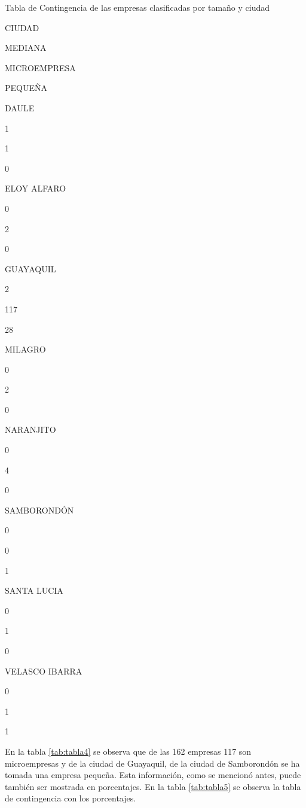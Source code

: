 \documentclass[]{book}
\newenvironment{Shaded}{\begin{snugshade}}{\end{snugshade}}
\newcommand{\KeywordTok}[1]{\textcolor[rgb]{0.13,0.29,0.53}{\textbf{#1}}}
\newcommand{\DataTypeTok}[1]{\textcolor[rgb]{0.13,0.29,0.53}{#1}}
\newcommand{\DecValTok}[1]{\textcolor[rgb]{0.00,0.00,0.81}{#1}}
\newcommand{\StringTok}[1]{\textcolor[rgb]{0.31,0.60,0.02}{#1}}
\newcommand{\OperatorTok}[1]{\textcolor[rgb]{0.81,0.36,0.00}{\textbf{#1}}}
\newcommand{\NormalTok}[1]{#1}
\begin{document}
\label{tab:tabla4}Tabla de Contingencia de las empresas clasificadas por
tamaño y ciudad

CIUDAD

MEDIANA

MICROEMPRESA

PEQUEÑA

DAULE

1

1

0

ELOY ALFARO

0

2

0

GUAYAQUIL

2

117

28

MILAGRO

0

2

0

NARANJITO

0

4

0

SAMBORONDÓN

0

0

1

SANTA LUCIA

0

1

0

VELASCO IBARRA

0

1

1

En la tabla \ref{tab:tabla4} se observa que de las 162 empresas 117 son
microempresas y de la ciudad de Guayaquil, de la ciudad de Samborondón
se ha tomada una empresa pequeña. Esta información, como se mencionó
antes, puede también ser mostrada en porcentajes. En la tabla
\ref{tab:tabla5} se observa la tabla de contingencia con los
porcentajes.

\begin{Shaded}
\end{Shaded}
\end{document}
